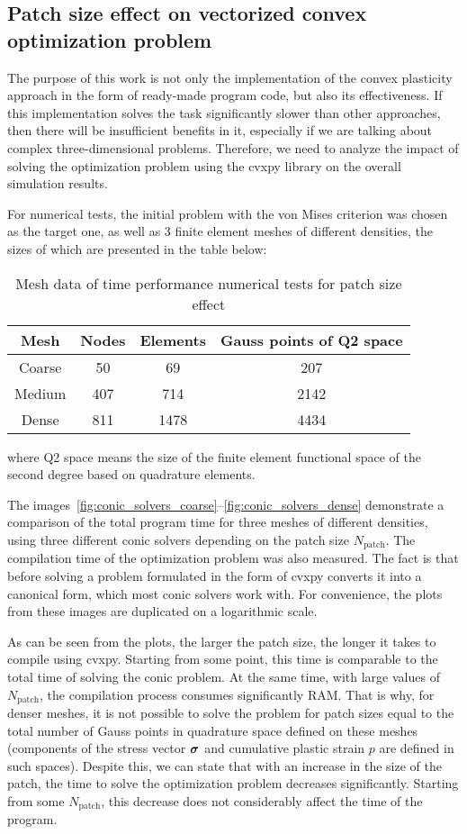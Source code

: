 \documentclass[12pt]{article}
\newcommand{\todolink}{\todo[fancyline, size=\scriptsize]{TOCITE}}
\begin{document}
\subsection{Patch size effect on vectorized convex optimization problem}
The purpose of this work is not only the implementation of the convex plasticity approach in the form of ready-made program code, but also its effectiveness. If this implementation solves the task significantly slower than other approaches, then there will be insufficient benefits in it, especially if we are talking about complex three-dimensional problems. Therefore, we need to analyze the impact of solving the optimization problem using the cvxpy library on the overall simulation results. 

For numerical tests, the initial problem with the von Mises criterion was chosen as the target one, as well as 3 finite element meshes of different densities, the sizes of which are presented in the table below:

\begin{table}[H]
	\centering
	\begin{tabular}{|cccc|}
		\hline
		Mesh & Nodes & Elements & Gauss points of Q2 space \\
		\hline
		Coarse & 50	& 69 & 207 \\
		Medium & 407 & 714 & 2142 \\
		Dense & 811	& 1478 & 4434 \\
		\hline
	\end{tabular}
	\caption{Mesh data of time performance numerical tests for patch size effect}
    \label{tab:cvxpy_tests}
\end{table}
where Q2 space means the size of the finite element functional space of the second degree based on quadrature elements.

The images~\ref{fig:conic_solvers_coarse}--\ref{fig:conic_solvers_dense} demonstrate a comparison of the total program time for three meshes of different densities, using three different conic solvers depending on the patch size $N_\text{patch}$. The compilation time of the optimization problem was also measured. The fact is that before solving a problem formulated in the form of \todolink cvxpy converts it into a canonical form, which most conic solvers work with. For convenience, the plots from these images are duplicated on a logarithmic scale.

As can be seen from the plots, the larger the patch size, the longer it takes to compile using cvxpy. Starting from some point, this time is comparable to the total time of solving the conic problem. At the same time, with large values of $N_\text{patch}$, the compilation process consumes significantly RAM. That is why, for denser meshes, it is not possible to solve the problem for patch sizes equal to the total number of Gauss points in quadrature space defined on these meshes (components of the stress vector $\mbox{\boldmath$\sigma$}$ and cumulative plastic strain $p$ are defined in such spaces). Despite this, we can state that with an increase in the size of the patch, the time to solve the optimization problem decreases significantly. Starting from some $N_\text{patch}$, this decrease does not considerably affect the time of the program.
\end{document}
